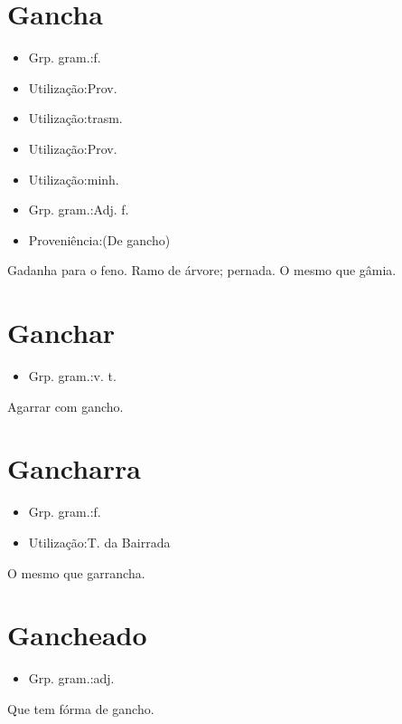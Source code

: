 \section{Gancha}
\begin{itemize}
\item {Grp. gram.:f.}
\end{itemize}
\begin{itemize}
\item {Utilização:Prov.}
\end{itemize}
\begin{itemize}
\item {Utilização:trasm.}
\end{itemize}
\begin{itemize}
\item {Utilização:Prov.}
\end{itemize}
\begin{itemize}
\item {Utilização:minh.}
\end{itemize}
\begin{itemize}
\item {Grp. gram.:Adj. f.}
\end{itemize}
\begin{itemize}
\item {Proveniência:(De \textunderscore gancho\textunderscore )}
\end{itemize}
Gadanha para o feno.
Ramo de árvore; pernada.
O mesmo que \textunderscore gâmia\textunderscore .
\section{Ganchar}
\begin{itemize}
\item {Grp. gram.:v. t.}
\end{itemize}
Agarrar com gancho.
\section{Gancharra}
\begin{itemize}
\item {Grp. gram.:f.}
\end{itemize}
\begin{itemize}
\item {Utilização:T. da Bairrada}
\end{itemize}
O mesmo que \textunderscore garrancha\textunderscore .
\section{Gancheado}
\begin{itemize}
\item {Grp. gram.:adj.}
\end{itemize}
Que tem fórma de gancho.
